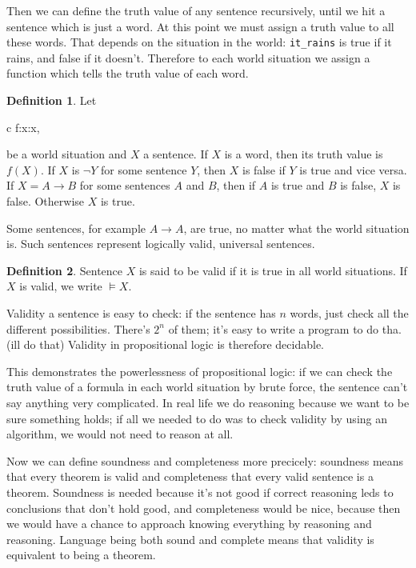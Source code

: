 \documentclass[11pt,oneside,%
]{memoir}
\newenvironment{eqna}{\begin{IEEEeqnarray}{c}}{\end{IEEEeqnarray}\ignorespacesafterend}
\theoremstyle{definition}
\newtheorem{maaritelma}{Definition}
\newcommand{\propositio}{\lstinline[language=propositio]}
\begin{document}
Then we can define the truth value of any sentence recursively, until we hit a sentence which is just a word. At this point we must assign a truth value to all these words. That depends on the situation in the world: \propositio!it_rains! is true if it rains, and false if it doesn't. Therefore to each world situation we assign a function which tells the truth value of each word.

\begin{maaritelma}
Let
\begin{eqna}
    f:\lbrace x:x\:\rbrace\rightarrow\lbrace{},\rbrace
\end{eqna}
be a world situation and \(X\) a sentence. If \(X\) is a word, then its truth value is \(f(X)\). If \(X\) is \(\neg Y\) for some sentence \(Y\), then \(X\) is false if \(Y\) is true and vice versa. If \(X=A\rightarrow B\) for some sentences \(A\) and \(B\), then if \(A\) is true and \(B\) is false, \(X\) is false. Otherwise \(X\) is true.
\end{maaritelma}
Some sentences, for example \(A\rightarrow A\), are true, no matter what the world situation is. Such sentences represent logically valid, universal sentences.
\begin{maaritelma}
Sentence \(X\) is said to be valid if it is true in all world situations. If \(X\) is valid, we write \(\vDash X\).
\end{maaritelma}
Validity a sentence is easy to check: if the sentence has \(n\) words, just check all the different possibilities. There's \(2^n\) of them; it's easy to write a program to do tha.(ill do that) Validity in propositional logic is therefore decidable.

This demonstrates the powerlessness of propositional logic: if we can check the truth value of a formula in each world situation by brute force, the sentence can't say anything very complicated. In real life we do reasoning because we want to be sure something holds; if all we needed to do was to check validity by using an algorithm, we would not need to reason at all.

Now we can define soundness and completeness more precicely: soundness means that every theorem is valid and completeness that every valid sentence is a theorem. Soundness is needed because it's not good if correct reasoning leds to conclusions that don't hold good, and completeness would be nice, because then we would have a chance to approach knowing everything by reasoning and reasoning. Language being both sound and complete means that validity is equivalent to being a theorem.%
\end{document}
